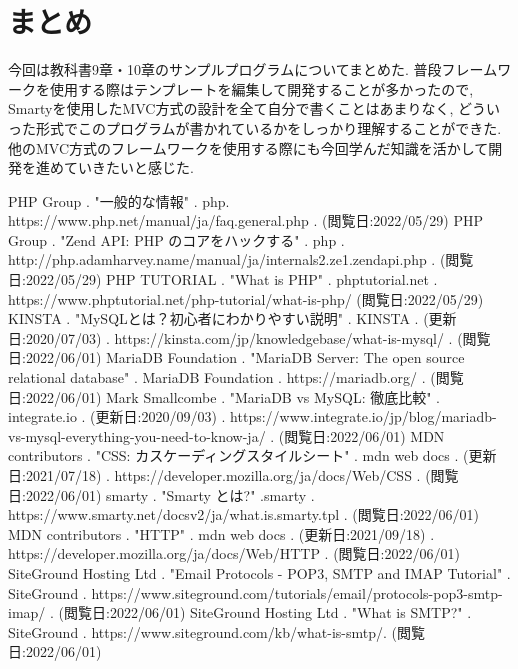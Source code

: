 \documentclass[submit,techrep]{ipsj}
\begin{document}
\section{まとめ}
今回は教科書9章・10章のサンプルプログラムについてまとめた. 普段フレームワークを使用する際はテンプレートを編集して開発することが多かったので, Smartyを使用したMVC方式の設計を全て自分で書くことはあまりなく, どういった形式でこのプログラムが書かれているかをしっかり理解することができた. 
他のMVC方式のフレームワークを使用する際にも今回学んだ知識を活かして開発を進めていきたいと感じた. 



\begin{thebibliography}{9}
 PHP Group . "一般的な情報" . php. https://www.php.net/manual/ja/faq.general.php . (閲覧日:2022/05/29)
 PHP Group . "Zend API: PHP のコアをハックする" . php . http://php.adamharvey.name/manual/ja/internals2.ze1.zendapi.php . (閲覧日:2022/05/29)
 PHP TUTORIAL . "What is PHP" . phptutorial.net . https://www.phptutorial.net/php-tutorial/what-is-php/ (閲覧日:2022/05/29)
 KINSTA . "MySQLとは？初心者にわかりやすい説明" . KINSTA . (更新日:2020/07/03) . https://kinsta.com/jp/knowledgebase/what-is-mysql/ . (閲覧日:2022/06/01)
 MariaDB Foundation . "MariaDB Server: The open source relational database" . MariaDB Foundation . https://mariadb.org/ . (閲覧日:2022/06/01)
 Mark Smallcombe . "MariaDB vs MySQL: 徹底比較" . integrate.io . (更新日:2020/09/03) . https://www.integrate.io/jp/blog/mariadb-vs-mysql-everything-you-need-to-know-ja/ . (閲覧日:2022/06/01)
 MDN contributors . "CSS: カスケーディングスタイルシート" . mdn web docs . (更新日:2021/07/18) . https://developer.mozilla.org/ja/docs/Web/CSS . (閲覧日:2022/06/01)
 smarty . "Smarty とは?" .smarty . https://www.smarty.net/docsv2/ja/what.is.smarty.tpl . (閲覧日:2022/06/01)
 MDN contributors . "HTTP" . mdn web docs . (更新日:2021/09/18) . https://developer.mozilla.org/ja/docs/Web/HTTP . (閲覧日:2022/06/01)
 SiteGround Hosting Ltd . "Email Protocols - POP3, SMTP and IMAP Tutorial" . SiteGround . https://www.siteground.com/tutorials/email/protocols-pop3-smtp-imap/ . (閲覧日:2022/06/01)
 SiteGround Hosting Ltd . "What is SMTP?" . SiteGround . https://www.siteground.com/kb/what-is-smtp/. (閲覧日:2022/06/01)
\end{thebibliography}
\end{document}
